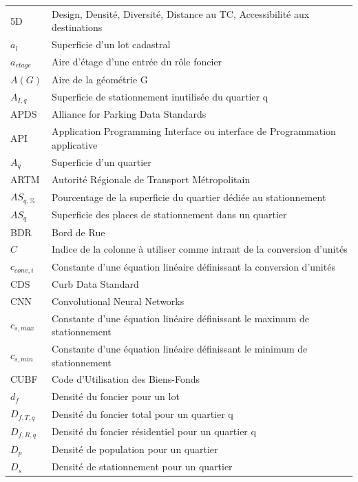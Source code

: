 \begin{longtable}{lp{5in}}
5D & Design, Densité, Diversité, Distance au TC, Accessibilité aux destinations\\
$a_l$ & Superficie d'un lot cadastral\\
$a_{etage}$ & Aire d'étage d'une entrée du rôle foncier \\
$A(G)$ & Aire de la géométrie G\\
$A_{I,q}$ & Superficie de stationnement inutilisée du quartier q \\
APDS    & Alliance for Parking Data Standards \\
API     & Application Programming Interface ou interface de Programmation applicative   \\
$A_q$ & Superficie d'un quartier\\
ARTM    & Autorité Régionale de Transport Métropolitain \\
$AS_{q,\%}$ & Pourcentage de la superficie du quartier dédiée au stationnement\\
$AS_q$ & Superficie des places de stationnement dans un quartier\\
BDR     & Bord de Rue                                               \\
$C$ & Indice de la colonne à utiliser comme intrant de la conversion d'unités \\
$c_{conv,i}$ & Constante d'une équation linéaire définissant la conversion d'unités  \\
CDS     & Curb Data Standard                                                            \\
CNN		& Convolutional Neural Networks                                                \\
$c_{s,max} $ & Constante d'une équation linéaire définissant le maximum de stationnement \\
$c_{s,min}$ & Constante d'une équation linéaire définissant le minimum de stationnement \\
CUBF    & Code d'Utilisation des Biens-Fonds                                            \\
$d_f$ & Densité du foncier pour un lot\\
$D_{f,T,q}$ & Densité du foncier total pour un quartier q\\
$D_{f,R,q}$ & Densité du foncier résidentiel pour un quartier q\\
$D_p$ & Densité de population pour un quartier\\
$D_s$ & Densité de stationnement pour un quartier \\

\end{longtable}
